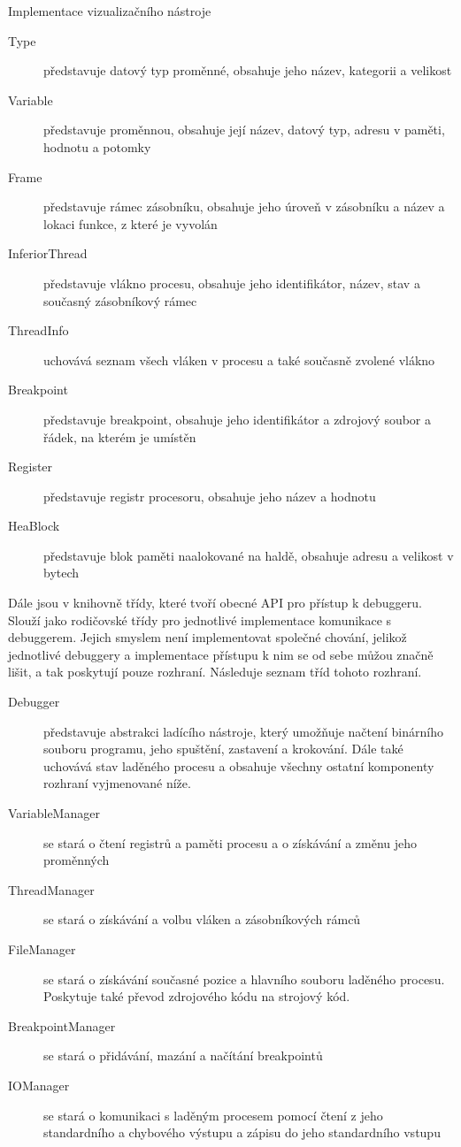 \documentclass[bc,male,python,dept460]{diploma}						%
\newcommand{\parspace}[1][]{
	\ifthenelse{\isempty{#1}}{\vspace{5mm}}{\vspace{#1}}
	\par
}
\begin{document}
\begin{section}{Implementace vizualizačního nástroje}
		\begin{description}
			\item[Type] představuje datový typ proměnné, obsahuje jeho název, kategorii a velikost
			\item[Variable] představuje proměnnou, obsahuje její název, datový typ, adresu v paměti, hodnotu a potomky
			\item[Frame] představuje rámec zásobníku, obsahuje jeho úroveň v zásobníku a název a lokaci funkce, z které je vyvolán %
			\item[InferiorThread] představuje vlákno procesu, obsahuje jeho identifikátor, název, stav a současný zásobníkový rámec
			\item[ThreadInfo] uchovává seznam všech vláken v procesu a také současně zvolené vlákno
			\item[Breakpoint] představuje breakpoint, obsahuje jeho identifikátor a zdrojový soubor a řádek, na kterém je umístěn
			\item[Register] představuje registr procesoru, obsahuje jeho název a hodnotu
			\item[HeaBlock] představuje blok paměti naalokované na haldě, obsahuje adresu a velikost v bytech
		\end{description}
		
		\parspace Dále jsou v knihovně třídy, které tvoří obecné API pro přístup k debuggeru. Slouží jako rodičovské třídy pro jednotlivé implementace
		komunikace s debuggerem. Jejich smyslem není implementovat společné chování, jelikož jednotlivé debuggery a implementace přístupu k nim
		se od sebe můžou značně lišit, a tak poskytují pouze rozhraní. Následuje seznam tříd tohoto rozhraní.
		
		\begin{description}
			\item[Debugger] představuje abstrakci ladícího nástroje, který umožňuje načtení binárního souboru programu, jeho spuštění, zastavení
			a krokování. Dále také uchovává stav laděného procesu a obsahuje všechny ostatní komponenty rozhraní vyjmenované níže.
			\item[VariableManager] se stará o čtení registrů a paměti procesu a o získávání a změnu jeho proměnných
			\item[ThreadManager] se stará o získávání a volbu vláken a zásobníkových rámců
			\item[FileManager] se stará o získávání současné pozice a hlavního souboru laděného procesu. Poskytuje také převod zdrojového kódu
			na strojový kód.
			\item[BreakpointManager] se stará o přidávání, mazání a načítání breakpointů
			\item[IOManager] se stará o komunikaci s laděným procesem pomocí čtení z jeho standardního a chybového výstupu a zápisu do jeho standardního vstupu
		\end{description}
		

\end{section}
\end{document}
